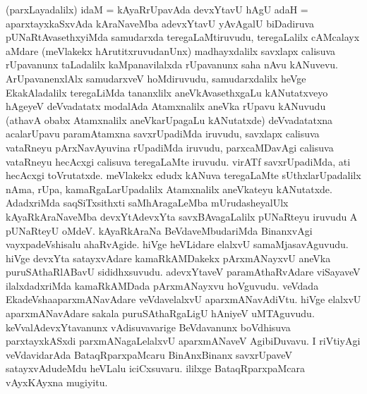 \begin{artha}
(parxLayadalilx) idaM = kAyaRrUpavAda devxYtavU hAgU adaH = aparxtayxkaSxvAda kAraNaveMba adevxYtavU yAvAgalU biDadiruva pUNaRtAvasethxyiMda samudarxda teregaLaMtiruvudu, teregaLalilx cAMcalayx aMdare (meVlakekx hArutitxruvudanUnx) madhayxdalilx savxlapx calisuva rUpavanunx taLadalilx kaMpanavilalxda rUpavanunx saha nAvu kANuvevu. ArUpavanenxlAlx samudarxveV hoMdiruvudu, samudarxdalilx heVge EkakAladalilx teregaLiMda tananxlilx  aneVkAvasethxgaLu kANutatxveyo hAgeyeV deVvadatatx modalAda Atamxnalilx aneVka rUpavu kANuvudu (athavA obabx Atamxnalilx aneVkarUpagaLu kANutatxde) deVvadatatxna acalarUpavu paramAtamxna savxrUpadiMda  iruvudu, savxlapx calisuva vataRneyu pArxNavAyuvina rUpadiMda iruvudu, parxcaMDavAgi calisuva vataRneyu hecAcxgi calisuva teregaLaMte iruvudu. virATf savxrUpadiMda, ati hecAcxgi toVrutatxde. meVlakekx edudx kANuva teregaLaMte sUthxlarUpadalilx nAma, rUpa, kamaRgaLa\break rUpadalilx Atamxnalilx aneVkateyu kANutatxde. AdadxriMda saqSiTxsithxti saMhAragaLeMba mUrudasheyalUlx kAyaRkAraNaveMba devxYtAdevxYta savxBAvagaLalilx pUNaRteyu iruvudu A pUNaRteyU oMdeV. kAyaRkAraNa BeVdaveMbudariMda BinanxvAgi vayxpadeVshisalu ahaRvAgide. hiVge heVLidare elalxvU samaMjasavAguvudu. hiVge devxYta satayxvAdare kamaRkAMDakekx pArxmANayxvU aneVka puruSAthaRlABavU sididhxsuvudu. adevxYtaveV paramAthaRvAdare viSayaveV ilalxdadxriMda kamaRkAMDada pArxmANayxvu hoVguvudu. veVdada EkadeVsha\break aparxmANavAdare veVdavelalxvU aparxmANavAdiVtu. hiVge elalxvU aparxmANavAdare sakala puruSAthaRgaLigU hAniyeV uMTAguvudu. keVvalAdevxYtavanunx vAdisuvavarige BeVdavanunx boVdhisuva parxtayxkASxdi parxmANagaLelalxvU aparxmANaveV AgibiDuvavu. I riVtiyAgi veVdavidarAda BataqRparxpaMcaru BinAnxBinanx savxrUpaveV satayxvAdudeMdu heVLalu iciCxsuvaru. ililxge BataqRparxpaMcara vAyxKAyxna mugiyitu. 
\end{artha}


